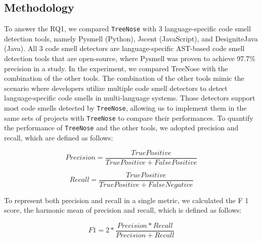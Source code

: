 


\subsection{Methodology}
\label{sec:methodology}

To answer the RQ1, we compared \texttt{TreeNose} with 3 language-specific code smell detection tools, namely Pysmell 
(Python), Jscent (JavaScript), and DesigniteJava (Java).
All 3 code smell detectors are language-specific AST-based code smell detection tools 
that are open-source, where Pysmell was proven to achieve 97.7\% precision in a study.
In the experiment, we compared TreeNose with the combination of the other tools.
The combination of the other tools mimic the scenario where developers utilize multiple code smell detectors to detect language-specific code smells in multi-language systems.
Those detectors support most code smells detected by \texttt{TreeNose}, allowing us to implement them in the same sets of projects with \texttt{TreeNose} to compare their performances.
To quantify the performance of \texttt{TreeNose} and the other tools, we adopted precision and recall, which are defined as follows:


\begin{equation}
    Precision = \frac{True Positive}{True Positive + False Positive}
\end{equation}

\begin{equation}
    Recall = \frac{True Positive}{True Positive + False Negative}
\end{equation}

To represent both precision and recall in a single metric, we calculated the F 1 score, the harmonic mean of precision and recall, which is defined as follows:

\begin{equation}
    F1 = 2 * \frac{Precision * Recall}{Precision + Recall}
\end{equation}

